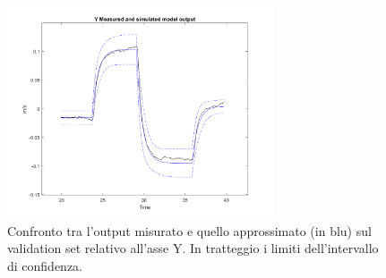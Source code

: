 \begin{figure}
    \centering
    \includegraphics[width=0.7\textwidth]{figs/chapter4/valytimeplot.png}
    \caption{Confronto tra l'output misurato e quello approssimato (in blu) sul validation set relativo all'asse Y. In tratteggio i limiti dell'intervallo di confidenza.}
    \label{fig:yvalerr}
\end{figure}

